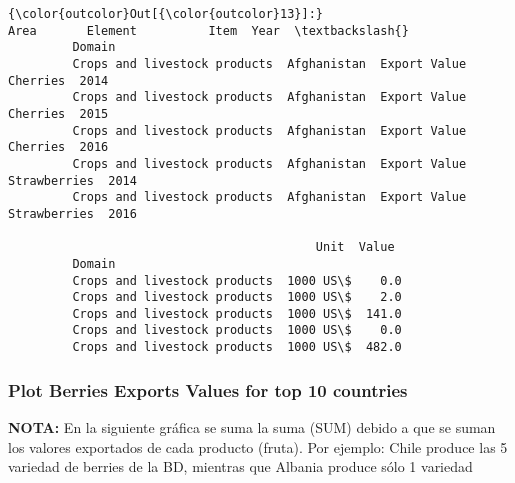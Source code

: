 \documentclass[11pt]{article}
\begin{document}
\begin{Verbatim}[commandchars=\\\{\}]
{\color{outcolor}Out[{\color{outcolor}13}]:}                                      Area       Element          Item  Year  \textbackslash{}
         Domain                                                                        
         Crops and livestock products  Afghanistan  Export Value      Cherries  2014   
         Crops and livestock products  Afghanistan  Export Value      Cherries  2015   
         Crops and livestock products  Afghanistan  Export Value      Cherries  2016   
         Crops and livestock products  Afghanistan  Export Value  Strawberries  2014   
         Crops and livestock products  Afghanistan  Export Value  Strawberries  2016   
         
                                           Unit  Value  
         Domain                                         
         Crops and livestock products  1000 US\$    0.0  
         Crops and livestock products  1000 US\$    2.0  
         Crops and livestock products  1000 US\$  141.0  
         Crops and livestock products  1000 US\$    0.0  
         Crops and livestock products  1000 US\$  482.0  
\end{Verbatim}
            
    \subsubsection{Plot Berries Exports Values for top 10
countries}\label{plot-berries-exports-values-for-top-10-countries}

    \textbf{NOTA:} En la siguiente gráfica se suma la suma (SUM) debido a
que se suman los valores exportados de cada producto (fruta). Por
ejemplo: Chile produce las 5 variedad de berries de la BD, mientras que
Albania produce sólo 1 variedad
\end{document}

